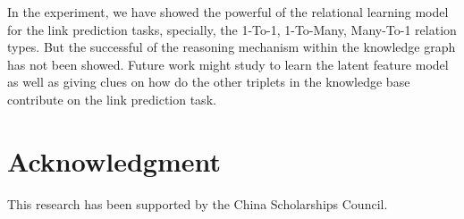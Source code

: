 \documentclass[9pt]{sig-alternate-05-2015}
\begin{document}
In the experiment, we have showed the powerful of the relational learning model for the link prediction tasks, specially, the 1-To-1, 1-To-Many, Many-To-1 relation types. But the successful of the reasoning mechanism within the knowledge graph has not been showed. Future work might study to learn the latent feature model as well as giving clues on how do the other triplets in the knowledge base contribute on the link prediction task.

\section*{Acknowledgment}
This research has been supported by the China Scholarships Council.




\balancecolumns
\end{document}
